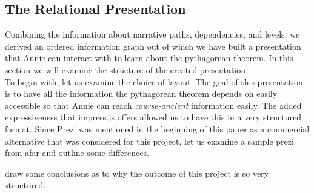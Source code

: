 \documentclass[twoside, 12pt]{article}
\begin{document}
\begin{figure}
\vspace{-50pt}
\end{figure}


\subsection{The Relational Presentation}
\label{sec:RelationalPresentations}

Combining the information about narrative paths, dependencies, and levels, we derived an ordered information graph out of which we have built a presentation that Annie can interact with to learn about the pythagorean theorem. In this section we will examine the structure of the created presentation.\\

To begin with, let us examine the choice of layout. The goal of this presentation is to have all the information the pythagorean theorem depends on easily accessible so that Annie can reach \textit{course-ancient} information easily. The added expressiveness that impress.js offers allowed us to have this in a very structured format. Since Prezi was mentioned in the beginning of this paper as a commercial alternative that was considered for this project, let us examine a sample prezi from afar and outline some differences. 

draw some conclusions as to why the outcome of this project is so very structured. 





\end{document}
